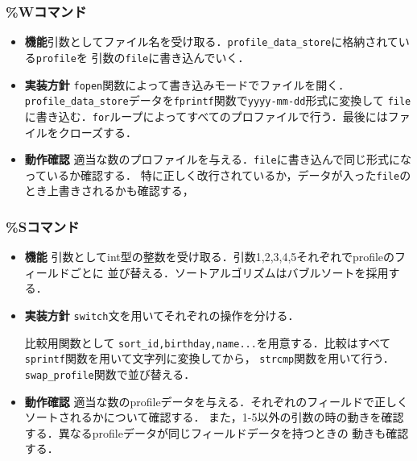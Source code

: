 \subsubsection{\%Wコマンド}
\begin{itemize}
  \item \textbf{機能}引数としてファイル名を受け取る．\texttt{profile\_data\_store}に格納されている\texttt{profile}を
  引数の\texttt{file}に書き込んでいく．
  \item \textbf{実装方針} \texttt{fopen}関数によって書き込みモードでファイルを開く．
  \texttt{profile\_data\_store}データを\texttt{fprintf}関数で\texttt{yyyy-mm-dd}形式に変換して
  \texttt{file}に書き込む．\texttt{for}ループによってすべてのプロファイルで行う．最後にはファイルをクローズする．
  \item \textbf{動作確認} 適当な数のプロファイルを与える．\texttt{file}に書き込んで同じ形式になっているか確認する．
  特に正しく改行されているか，データが入った\texttt{file}のとき上書きされるかも確認する，
\end{itemize}
\subsubsection{\%Sコマンド}
\begin{itemize}
  \item \textbf{機能} 引数としてint型の整数を受け取る．引数1,2,3,4,5それぞれでprofileのフィールドごとに
  並び替える．ソートアルゴリズムはバブルソートを採用する．
  \item \textbf{実装方針} \texttt{switch}文を用いてそれぞれの操作を分ける．
  
  比較用関数として
  \texttt{sort\_id,birthday,name...}を用意する．比較はすべて\texttt{sprintf}関数を用いて文字列に変換してから，
  \texttt{strcmp}関数を用いて行う．\texttt{swap\_profile}関数で並び替える．
  \item \textbf{動作確認} 適当な数のprofileデータを与える．それぞれのフィールドで正しくソートされるかについて確認する．
  また，1-5以外の引数の時の動きを確認する．異なるprofileデータが同じフィールドデータを持つときの
  動きも確認する．
\end{itemize}
